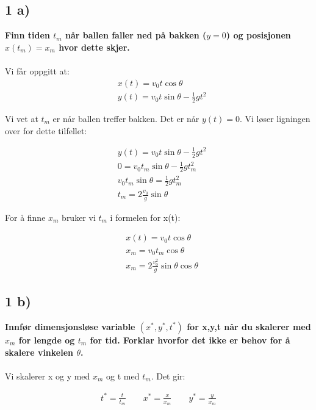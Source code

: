 \subsection*{1 a)}

\textbf{Finn tiden $t_m$ når ballen faller ned på bakken ($y=0$) og
posisjonen $x(t_m) = x_m$ hvor dette skjer.}
\\
\\
Vi får oppgitt at:
\begin{align*}
    &x(t) = v_0t \cos{\theta}
    \\
    &y(t) = v_0t \sin{\theta} - \frac{1}{2}gt^2
\end{align*}

Vi vet at $t_m$ er når ballen treffer bakken. Det er når $y(t) = 0$.
Vi løser ligningen over for dette tilfellet:

\begin{align*}
    &y(t) = v_0t \sin{\theta} - \frac{1}{2}gt^2
    \\
    &0 = v_0t_m \sin{\theta} - \frac{1}{2}gt_m^2
    \\
    &v_0t_m \sin{\theta} = \frac{1}{2}gt_m^2
    \\
    &t_m = 2 \frac{v_0}{g}\sin{\theta}
\end{align*}

For å finne $x_m$ bruker vi $t_m$ i formelen for x(t):

\begin{align*}
    &x(t) = v_0t \cos{\theta}
    \\
    &x_m = v_0t_m \cos{\theta}
    \\
    &x_m = 2 \frac{v_0^2}{g}\sin{\theta} \cos{\theta}
\end{align*}


\subsection*{1 b)}

\textbf{Innfør dimensjonsløse variable $(x^*,y^*,t^*)$ for x,y,t når du skalerer
 med $x_m$ for lengde og $t_m$ for tid. Forklar hvorfor det ikke er behov for å
 skalere vinkelen $\theta$.}
\\
\\
Vi skalerer x og y med $x_m$ og t med $t_m$. Det gir:

\begin{align*}
    t^* = \frac{t}{t_m}
    \qquad
    x^* = \frac{x}{x_m}
    \qquad
    y^* = \frac{y}{x_m}
\end{align*}

